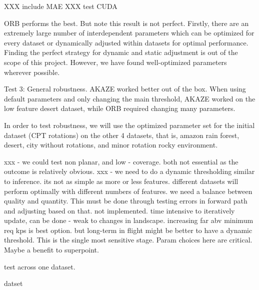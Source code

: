 XXX include MAE
XXX test CUDA

ORB performs the best. But note this result is not perfect. Firstly, there are an extremely large number of interdependent parameters which can be optimized for every dataset or dynamically adjusted within datasets for optimal performance. Finding the perfect strategy for dynamic and static adjustment is out of the scope of this project. However, we have found well-optimized parameters wherever possible. 

Test 3:
General robustness. AKAZE worked better out of the box. When using default parameters and only changing the main threshold, AKAZE worked on the low feature desert dataset, while ORB required changing many parameters. 


In order to test robustness, we will use the optimized parameter set for the initial dataset (CPT rotations) on the other 4 datasets, that is, amazon rain forest, desert, city without rotations, and minor rotation rocky environment. 

xxx - we could test non planar, and low - coverage. both not essential as the outcome is relatively obvious. 
xxx - we need to do a dynamic thresholding similar to inference. its not as simple as more or less features. different datasets will perform optimally with different numbers of features. we need a balance between quality and quantity. This must be done through testing errors in forward path and adjusting based on that. not implemented. 
time intensive to iteratively update, can be done - weak to changes in landscape. increasing far abv minimum req kps is best option. but long-term in flight might be better to have a dynamic threshold.
This is the single most sensitive stage. Param choices here are critical. Maybe a benefit to superpoint. 

test across one dataset.     

datset 


